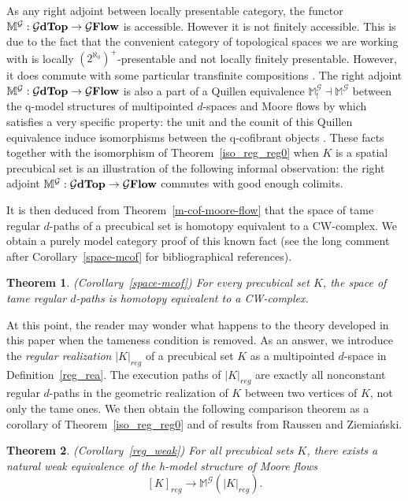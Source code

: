 \documentclass[a4paper,12pt]{amsart}
\newtheorem*{thmN}{Theorem}
\theoremstyle{definition}
\newcommand{\ptop}[1]{{\brm{{#1}dTop}}}
\newcommand{\moore}{{\mathbb{M}}}
\newcommand{\lmoore}{\mathbb{M}_!}
\newcommand{\brm}[1]{{\rm{\mathbf{#1}}}}
\newcommand{\dtopG}{{\mathcal{G}\brm{Flow}}}
\begin{document}
As any right adjoint between locally presentable category, the functor $\moore^{\mathcal{G}}:\ptop{\mathcal{G}} \to \dtopG$ is accessible. However it is not finitely accessible. This is due to the fact that the convenient category of topological spaces we are working with is locally $(2^{\aleph_0})^+$-presentable and not locally finitely presentable. However, it does commute with some particular transfinite compositions \cite[Theorem~6.14]{Moore1} \cite[Theorem~5.7]{Moore2}. The right adjoint $\moore^{\mathcal{G}}:\ptop{\mathcal{G}} \to \dtopG$ is also a part of a Quillen equivalence $\lmoore^{\mathcal{G}}\dashv \moore^{\mathcal{G}}$ between the q-model structures of multipointed $d$-spaces and Moore flows by \cite[Theorem~8.1]{Moore2} which satisfies a very specific property: the unit and the counit of this Quillen equivalence induce isomorphisms between the q-cofibrant objects \cite[Theorem~7.6 and Corollary~7.9]{Moore2}. These facts together with the isomorphism of Theorem~\ref{iso_reg_reg0} when $K$ is a spatial precubical set is an illustration of the following informal observation: the right adjoint $\moore^{\mathcal{G}}:\ptop{\mathcal{G}} \to \dtopG$ commutes with good enough colimits.

It is then deduced from Theorem~\ref{m-cof-moore-flow} that the space of tame regular $d$-paths of a precubical set is homotopy equivalent to a CW-complex. We obtain a purely model category proof of this known fact (see the long comment after Corollary~\ref{space-mcof} for bibliographical references). 


\begin{thmN} (Corollary~\ref{space-mcof})
For every precubical set $K$, the space of tame regular $d$-paths is homotopy equivalent to a CW-complex.
\end{thmN}

At this point, the reader may wonder what happens to the theory developed in this paper when the tameness condition is removed. As an answer, we introduce the \textit{regular realization} $|K|_{reg}$ of a precubical set $K$ as a multipointed $d$-space in Definition~\ref{reg_rea}. The execution paths of $|K|_{reg}$ are exactly all nonconstant regular $d$-paths in the geometric realization of $K$ between two vertices of $K$, not only the tame ones. We then obtain the following comparison theorem as a corollary of Theorem~\ref{iso_reg_reg0} and of results from Raussen and Ziemia{\'{n}}ski.

\begin{thmN} (Corollary~\ref{reg_weak})
	For all precubical sets $K$, there exists a natural weak equivalence of the h-model structure of Moore flows 
	\[
	[K]_{reg} \longrightarrow \moore^{\mathcal{G}}(|K|_{reg}).
	\]
\end{thmN} 
\end{document}
